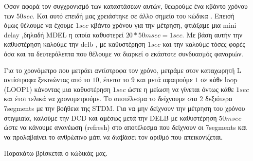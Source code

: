 \documentclass[a4paper,10pt]{article} \usepackage{anysize}
\begin{document}
Όσον αφορά τον συγχρονισμό των καταστάσεων αυτών, θεωρούμε ένα κβάντο χρόνου
των $50 sec$. Και αυτό επειδή μας χρειάστηκε σε άλλο σημείο του κώδικα . Επεισή
όμως θέλουμε να έχουμε  $1 sec$ κβάντο χρόνου για την μέτρηση, φτιάξαμε μια
mini delay ,δηλαδή MDEL η οποία καθυστερεί $20* 50msec = 1 sec$. Με βάση αυτήν
την καθυστέρηση καλούμε την delb , με  καθυστέρηση $1 sec$ και την καλούμε τόσες
φορές όσα και τα δευτερόλεπτα που θέλουμε να διαρκεί ο εκάστοτε συνδυασμός
φαναριών.

Για το χρονόμετρο που μετράει αντίστροφα τον χρόνο, μετράμε στον καταχωρητή L
αντίστροφα ξεκινώντας από το $10$, έπειτα το $9$ και μετά αφαιρούμε $1$ σε κάθε
loop (LOOP1) κάνοντας μια καθυστέρηση $1 sec$ ώστε η μείωση να γίνεται όντως
κάθε $1 sec$ και έτσι τελικά να χρονομετρούμε. Το αποτέλεσμα το δείχνουμε στα 2
δεξιότερα 7segments με την βοήθεια της STDM. Για να μην δείχνουν την μέτρηση
του χρόνου στιγμιαία, καλούμε την DCD και αμέσως μετά την DELB με καθυστέρηση
$50 msec$ ώστε να κάνουμε ανανέωση (refresh) στο αποτέλεσμα που δείχνουν οι
7segments και να προλαβαίνει το ανθρώπινο μάτι να διαβάσει τον αριθμό που
απεικονίζεται.

Παρακάτω βρίσκεται ο κώδικάς μας.

\inputminted[linenos,obeytabs,frame=leftline,fontsize=\footnotesize]{oldasm}{files/fanaria.8085}
\end{document}
